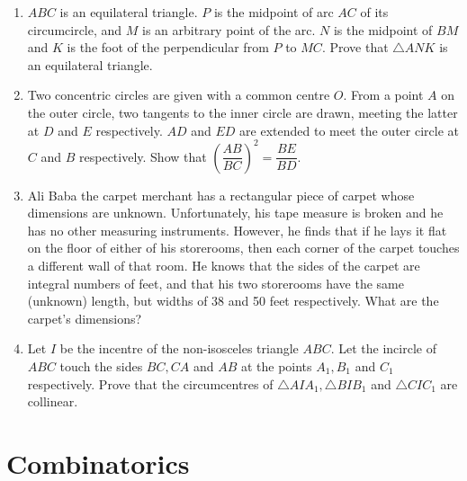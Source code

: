 \documentclass[12pt]{article}
\begin{document}
\begin{enumerate}[resume]
    \item $ABC$ is an equilateral triangle. $P$ is the midpoint of arc $AC$ of its circumcircle, and $M$ is an arbitrary point of the arc. $N$ is the midpoint of $BM$ and $K$ is the foot of the perpendicular from $P$ to $MC$. Prove that $\triangle ANK$ is an equilateral triangle.

    \item Two concentric circles are given with a common centre $O$. From a point $A$ on the outer circle, two tangents to the inner circle are drawn, meeting the latter at $D$ and $E$ respectively. $AD$ and $ED$ are extended to meet the outer circle at $C$ and $B$ respectively. Show that $(\dfrac{AB}{BC})^{2}=\dfrac{BE}{BD}$.

    \item Ali Baba the carpet merchant has a rectangular piece of carpet whose dimensions are unknown. Unfortunately, his tape measure is broken and he has no other measuring instruments. However, he finds that if he lays it flat on the floor of either of his storerooms, then each corner of the carpet touches a different wall of that room. He knows that the sides of the carpet are integral numbers of feet, and that his two storerooms have the same (unknown) length, but widths of 38 and 50 feet respectively. What are the carpet's dimensions?

    \item Let $I$ be the incentre of the non-isosceles triangle $ABC$. Let the incircle of $ABC$ touch the sides $BC, CA$ and $AB$ at the points $A_{1}, B_{1}$ and $C_{1}$ respectively. Prove that the circumcentres of $\triangle AIA_{1}, \triangle BIB_{1}$ and $\triangle CIC_{1}$ are collinear.
\end{enumerate}


\section*{Combinatorics}
\end{document}
